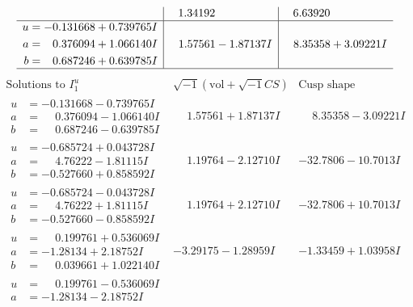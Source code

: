 \documentclass[1p]{elsarticle_modified}
\theoremstyle{definition}
\newcommand{\I}{\sqrt{-1}}
\begin{document}
$$\begin{array}{c|c|c}
 & \phantom{-}1.34192\phantom{ +0.000000I} & \phantom{-}6.63920\phantom{ +0.000000I} \\ \hline\begin{aligned}
u &= -0.131668 + 0.739765 I \\
a &= \phantom{-}0.376094 + 1.066140 I \\
b &= \phantom{-}0.687246 + 0.639785 I\end{aligned}
 & \phantom{-}1.57561 - 1.87137 I & \phantom{-}8.35358 + 3.09221 I\\
 \hline 
 \end{array}$$\newpage$$\begin{array}{c|c|c}  
\text{Solutions to }I^u_{1}& \I (\text{vol} + \sqrt{-1}CS) & \text{Cusp shape}\\
 \hline 
\begin{aligned}
u &= -0.131668 - 0.739765 I \\
a &= \phantom{-}0.376094 - 1.066140 I \\
b &= \phantom{-}0.687246 - 0.639785 I\end{aligned}
 & \phantom{-}1.57561 + 1.87137 I & \phantom{-}8.35358 - 3.09221 I \\ \hline\begin{aligned}
u &= -0.685724 + 0.043728 I \\
a &= \phantom{-}4.76222 - 1.81115 I \\
b &= -0.527660 + 0.858592 I\end{aligned}
 & \phantom{-}1.19764 - 2.12710 I & -32.7806 - 10.7013 I \\ \hline\begin{aligned}
u &= -0.685724 - 0.043728 I \\
a &= \phantom{-}4.76222 + 1.81115 I \\
b &= -0.527660 - 0.858592 I\end{aligned}
 & \phantom{-}1.19764 + 2.12710 I & -32.7806 + 10.7013 I \\ \hline\begin{aligned}
u &= \phantom{-}0.199761 + 0.536069 I \\
a &= -1.28134 + 2.18752 I \\
b &= \phantom{-}0.039661 + 1.022140 I\end{aligned}
 & -3.29175 - 1.28959 I & -1.33459 + 1.03958 I \\ \hline\begin{aligned}
u &= \phantom{-}0.199761 - 0.536069 I \\
a &= -1.28134 - 2.18752 I \\

\end{aligned}
\end{array}$$
\end{document}
